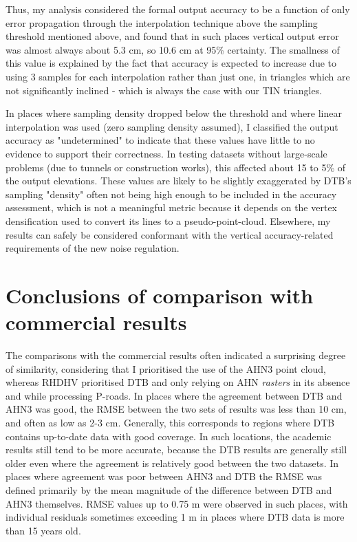 Thus, my analysis considered the formal output accuracy to be a function of only error propagation through the interpolation technique above the sampling threshold mentioned above, and found that in such places vertical output error was almost always about 5.3 cm, so 10.6 cm at 95\% certainty. The smallness of this value is explained by the fact that accuracy is expected to increase due to using 3 samples for each interpolation rather than just one, in triangles which are not significantly inclined - which is always the case with our TIN triangles.

In places where sampling density dropped below the threshold and where linear interpolation was used (zero sampling density assumed), I classified the output accuracy as "undetermined" to indicate that these values have little to no evidence to support their correctness. In testing datasets without large-scale problems (due to tunnels or construction works), this affected about 15 to 5\% of the output elevations. These values are likely to be slightly exaggerated by DTB's sampling "density" often not being high enough to be included in the accuracy assessment, which is not a meaningful metric because it depends on the vertex densification used to convert its lines to a pseudo-point-cloud. Elsewhere, my results can safely be considered conformant with the vertical accuracy-related requirements of the new noise regulation.

\section{Conclusions of comparison with commercial results}
\label{sec:conclusionscomparison}

The comparisons with the commercial results often indicated a surprising degree of similarity, considering that I prioritised the use of the AHN3 point cloud, whereas RHDHV prioritised DTB and only relying on AHN \textit{rasters} in its absence and while processing P-roads. In places where the agreement between DTB and AHN3 was good, the RMSE between the two sets of results was less than 10 cm, and often as low as 2-3 cm. Generally, this corresponds to regions where DTB contains up-to-date data with good coverage. In such locations, the academic results still tend to be more accurate, because the DTB results are generally still older even where the agreement is relatively good between the two datasets. In places where agreement was poor between AHN3 and DTB the RMSE was defined primarily by the mean magnitude of the difference between DTB and AHN3 themselves. RMSE values up to 0.75 m were observed in such places, with individual residuals sometimes exceeding 1 m in places where DTB data is more than 15 years old.

